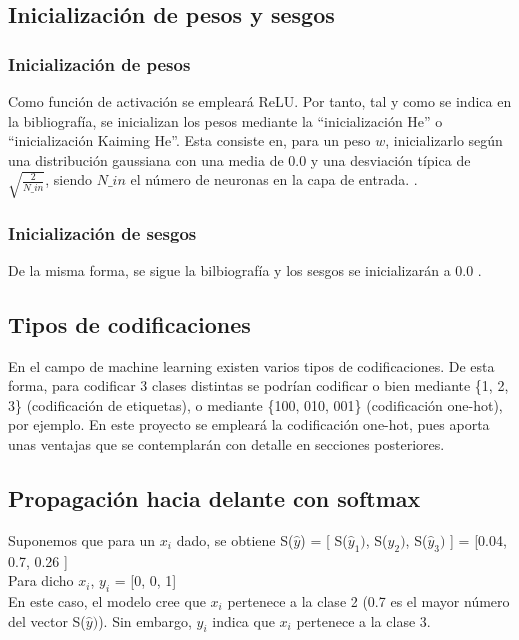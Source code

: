 \subsection{Inicialización de pesos y sesgos}

\subsubsection{Inicialización de pesos}
Como función de activación se empleará ReLU. Por tanto, tal y como se indica en la bibliografía, se inicializan los pesos mediante la ``inicialización He'' o ``inicialización Kaiming He''. Esta consiste en, para un peso $w$, inicializarlo según una distribución gaussiana con una media de 0.0 y una desviación típica de $\sqrt{\frac{2}{N\_in}}$, siendo $N\_in$ el número de neuronas en la capa de entrada.
 \cite{ini_He} \cite{ini_He_2} \cite{ini_He_code}.

\subsubsection{Inicialización de sesgos}

De la misma forma, se sigue la bilbiografía y los sesgos se inicializarán a 0.0 . \cite{ini_bias} \cite{ini_bias_2}

\subsection{Tipos de codificaciones}

En el campo de machine learning existen varios tipos de codificaciones. De esta forma, para codificar 3 clases distintas se podrían codificar o bien mediante \{1, 2, 3\} (codificación de etiquetas), o mediante \{100, 010, 001\} (codificación one-hot), por ejemplo. En este proyecto se empleará la codificación one-hot, pues aporta unas ventajas que se contemplarán con detalle en secciones posteriores.

\subsection{Propagación hacia delante con softmax}

Suponemos que para un $x_i$ dado, se obtiene S($\hat{y}$) = [ S($\hat{y}_1)$, S($\hat{y}_2)$, S($\hat{y}_3)$ ] = [0.04, 0.7, 0.26 ] \\
Para dicho $x_i$, $y_i$ = [0, 0, 1] \\
En este caso, el modelo cree que $x_i$ pertenece a la clase 2 (0.7 es el mayor número del vector S($\hat{y})$). Sin embargo, $y_i$ indica que $x_i$ pertenece a la clase 3. \\

